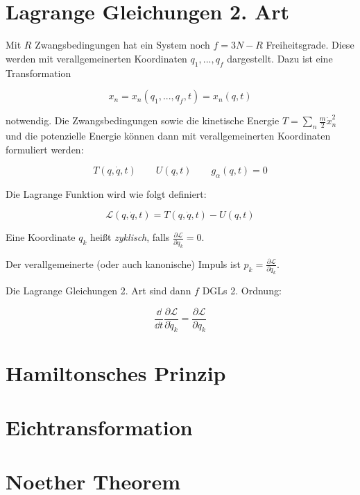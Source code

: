 \section{Lagrange Gleichungen 2. Art}

\begin{frameddefn}

Mit $R$ Zwangsbedingungen hat ein System noch $f = 3N - R$ Freiheitsgrade. Diese werden mit verallgemeinerten Koordinaten $q_1, ... , q_f$ dargestellt. Dazu ist eine Transformation 

\[ x_n = x_n(q_1, ..., q_f, t) = x_n(q,t) \]

notwendig. Die Zwangsbedingungen sowie die kinetische Energie $T = \sum_n \frac{m}{2} \dot x_n^2$ und die potenzielle Energie können dann mit verallgemeinerten Koordinaten formuliert werden:

\[ T(q, \dot q, t) \qquad U(q,t) \qquad g_\alpha(q,t) = 0 \]
	
\end{frameddefn}

\begin{frameddefn}

Die Lagrange Funktion wird wie folgt definiert:

\[ \mathscr{L}(q,\dot q, t) = T(q, \dot q, t) - U(q,t) \]

Eine Koordinate $q_k$ heißt \textit{zyklisch}, falls $\frac{\partial \mathscr{L}}{\partial q_k} = 0$.

Der verallgemeinerte (oder auch kanonische) Impuls ist $p_k = \frac{\partial \mathscr{L}}{\partial \dot q_k}$.

Die Lagrange Gleichungen 2. Art sind dann $f$ DGLs 2. Ordnung:

\[ \frac{\dd}{\dd t} \frac{\partial \mathscr{L}}{\partial \dot q_k} = \frac{\partial \mathscr{L}}{\partial q_k} \]
	
\end{frameddefn}


\section{Hamiltonsches Prinzip}

\section{Eichtransformation}

\section{Noether Theorem}